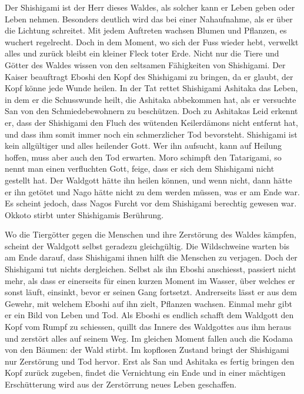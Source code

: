 Der Shishigami ist der Herr dieses Waldes, als solcher kann er Leben geben oder Leben nehmen. Besonders deutlich wird das bei einer Nahaufnahme, als er über die Lichtung schreitet. Mit jedem Auftreten wachsen Blumen und Pflanzen, es wuchert regelrecht. Doch in dem Moment, wo sich der Fuss wieder hebt, verwelkt alles und zurück bleibt ein kleiner Fleck toter Erde. Nicht nur die Tiere und Götter des Waldes wissen von den seltsamen Fähigkeiten von Shishigami. Der Kaiser beauftragt Eboshi den Kopf des Shishigami zu bringen, da er glaubt, der Kopf könne jede Wunde heilen. In der Tat rettet Shishigami Ashitaka das Leben, in dem er die Schusswunde heilt, die Ashitaka abbekommen hat, als er versuchte San von den Schmiedebewohnern zu beschützen. Doch zu Ashitakas Leid erkennt er, dass der Shishigami den Fluch des wütenden Keilerdämons nicht entfernt hat, und dass ihm somit immer noch ein schmerzlicher Tod bevor\-steht. Shishigami ist kein allgültiger und alles heilender Gott. Wer ihn aufsucht, kann auf Heilung hoffen, muss aber auch den Tod erwarten. Moro schimpft den Tatarigami, so nennt man einen verfluchten Gott, feige, dass er sich dem Shishigami nicht gestellt hat. Der Waldgott hätte ihn heilen können, und wenn nicht, dann hätte er ihn getötet und Nago hätte nicht zu dem werden müssen, was er am Ende war. Es scheint jedoch, dass Nagos Furcht vor dem Shishigami berechtig gewesen war. Okkoto stirbt unter Shishigamis Berührung. 

Wo die Tiergötter gegen die Menschen und ihre Zerstörung des Waldes kämpfen, scheint der Waldgott selbst geradezu gleichgültig. Die Wildschweine warten bis am Ende darauf, dass Shishigami ihnen hilft die Menschen zu verjagen. Doch der Shishigami tut nichts dergleichen. Selbst als ihn Eboshi anschiesst, passiert nicht mehr, als dass er einerseits für einen kurzen Moment im Wasser, über welches er sonst läuft, einsinkt, bevor er seinen Gang fortsetzt. Andrerseits lässt er aus dem Gewehr, mit welchem Eboshi auf ihn zielt, Pflanzen wachsen. Einmal mehr gibt er ein Bild von Leben und Tod. Als Eboshi es endlich schafft dem Waldgott den Kopf vom Rumpf zu schiessen, quillt das Innere des Waldgottes aus ihm heraus und zerstört alles auf seinem Weg. Im gleichen Moment fallen auch die Kodama von den Bäumen: der Wald stirbt. Im kopflosen Zustand bringt der Shishigami nur Zerstörung und Tod hervor. Erst als San und Ashitaka es fertig bringen den Kopf zurück zugeben, findet die Vernichtung ein Ende und in einer mächtigen Erschütterung wird aus der Zerstörrung neues Leben geschaffen. 